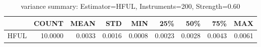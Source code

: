 \begin{table}[ht]
\centering
\caption{variance summary: Estimator=HFUL, Instruments=200, Strength=0.60}
\begin{tabular}{lrrrrrrrr}
\toprule
 & COUNT & MEAN & STD & MIN & 25\% & 50\% & 75\% & MAX \\
\midrule
HFUL & 10.0000 & 0.0033 & 0.0016 & 0.0008 & 0.0023 & 0.0028 & 0.0043 & 0.0061 \\
\bottomrule
\end{tabular}
\end{table}
